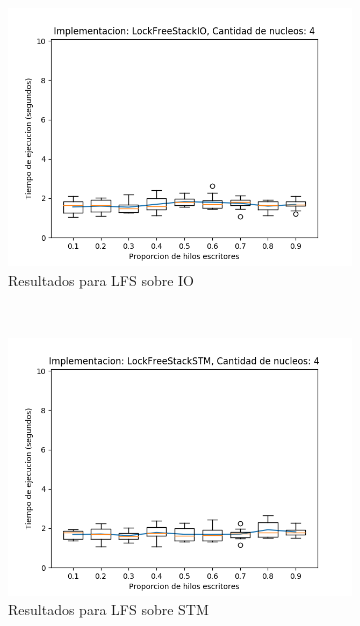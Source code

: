 \begin{appendices}
\begin{figure}[H]
\begin{subfigure}[b]{0.49\textwidth}
        \includegraphics[width=\textwidth]{images/pushPercentages/plots/expLFSIO-4}
        \caption{Resultados para LFS sobre IO}
        \label{subfig:pushPercentages-lfsio-4}
    \end{subfigure}
    ~
    \begin{subfigure}[b]{0.49\textwidth}
        \includegraphics[width=\textwidth]{images/pushPercentages/plots/expLFSSTM-4}
        \caption{Resultados para LFS sobre STM}
        \label{subfig:pushPercentages-lfsstm-4}
    \end{subfigure}
    \begin{subfigure}[b]{0.49\textwidth}

\end{subfigure}
\end{figure}
\end{appendices}
